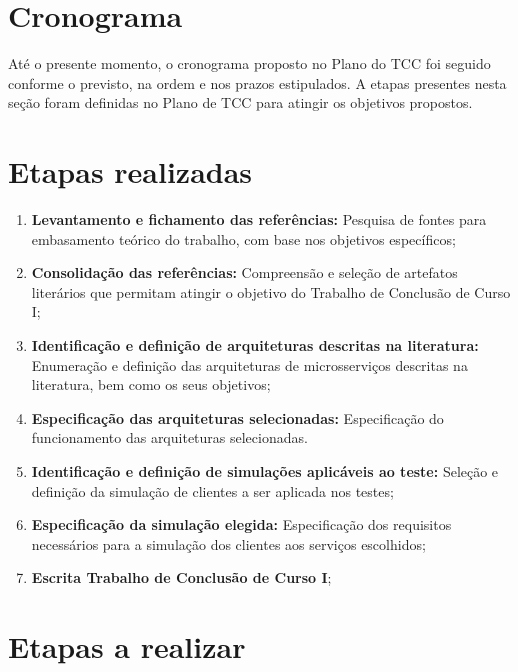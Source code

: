 \section{Cronograma}



Até o presente momento, o cronograma proposto no Plano do TCC foi seguido conforme o previsto, na ordem e nos prazos estipulados.
%
A etapas presentes nesta seção foram definidas no Plano de TCC para atingir os objetivos propostos.



\section{Etapas realizadas}



\begin{enumerate}
  \item \textbf{Levantamento e fichamento das referências:} Pesquisa de fontes para embasamento teórico do trabalho, com base nos objetivos específicos;

  \item \textbf{Consolidação das referências:} Compreensão e seleção de artefatos literários que permitam atingir o objetivo do Trabalho de Conclusão de Curso I;

  \item \textbf{Identificação e definição de arquiteturas descritas na literatura:} Enumeração e definição das arquiteturas de microsserviços descritas na literatura, bem como os seus objetivos;

  \item \textbf{Especificação das arquiteturas selecionadas:} Especificação do funcionamento das arquiteturas selecionadas.

  \item \textbf{Identificação e definição de simulações aplicáveis ao teste:} Seleção e definição da simulação de clientes a ser aplicada nos testes;

  \item \textbf{Especificação da simulação elegida:} Especificação dos requisitos necessários para a simulação dos clientes aos serviços escolhidos;

  \item \textbf{Escrita Trabalho de Conclusão de Curso I};
\end{enumerate}



\section{Etapas a realizar}



